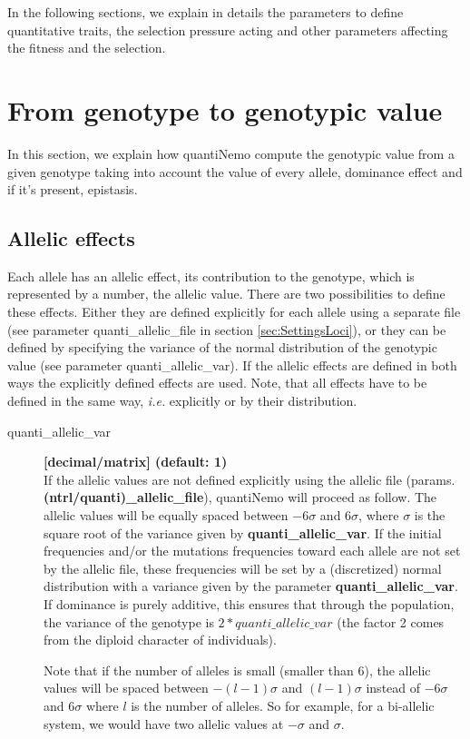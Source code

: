 \documentclass[letterpaper,12pt,oneside]{book}
\begin{document}
In the following sections, we explain in details the parameters to define quantitative traits, the selection pressure acting and other parameters affecting the fitness and the selection. 

\section{From genotype to genotypic value }
In this section, we explain how quantiNemo compute the genotypic value from a given genotype taking into account the value of every allele, dominance effect and if it's present, epistasis. 
\subsection{Allelic effects}\label{sub:AllelicEffects}
Each allele has an allelic effect, its contribution to the genotype, which is represented by a number, the allelic value. There are two possibilities to define these effects. Either they are defined explicitly for each allele using a separate file (see parameter \textsf{quanti\_allelic\_file} in section \ref{sec:SettingsLoci}), or they can be defined by specifying the variance of the normal distribution of the genotypic value (see parameter \textsf{quanti\_allelic\_var}). If the allelic effects are defined in both ways the explicitly defined effects are used. Note, that all effects have to be defined in the same way, \textit{i.e.} explicitly or by their distribution.

\begin{description}

\item[quanti\_allelic\_var] \textbf{[decimal/matrix]  (default: 1)}\\

If the allelic values are not defined explicitly using the allelic file (params. \textbf{(ntrl/quanti)\_allelic\_file}), quantiNemo will proceed as follow. The allelic values will be equally spaced between $-6 \sigma$ and $6 \sigma$, where $\sigma$ is the square root of the variance given by \textbf{quanti\_allelic\_var}. If the initial frequencies and/or the mutations frequencies toward each allele are not set by the allelic file, these frequencies will be set by a (discretized) normal distribution with a variance given by the parameter \textbf{quanti\_allelic\_var}. If dominance is purely additive, this ensures that through the population, the variance of the genotype is $2*quanti\_allelic\_var$ (the factor 2 comes from the diploid character of individuals).

Note that if the number of alleles is small (smaller than 6), the allelic values will be spaced between $-(l-1)\sigma$ and $(l-1)\sigma$ instead of  $-6 \sigma$ and $6 \sigma$  where $l$ is the number of alleles. So for example, for a bi-allelic system, we would have two allelic values at $-\sigma$ and $\sigma$.
\end{description} 
\end{document}
